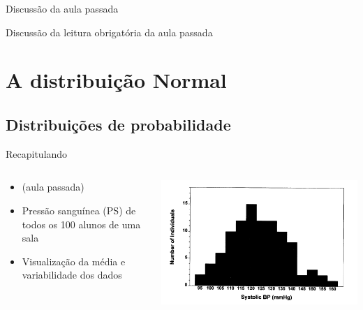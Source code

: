 \documentclass{beamer}
\begin{document}

\begin{frame}{\scriptsize Discussão da aula passada}
  \begin{block}{}
    Discussão da leitura obrigatória da aula passada
  \end{block}
\end{frame}

\section{A distribuição Normal}

\subsection{Distribuições de probabilidade}

\begin{frame}{\scriptsize Recapitulando}
  \begin{columns}
    \begin{column}{5cm}
      \begin{itemize}
      \item (aula passada)
      \item Pressão sanguínea (PS) de todos os 100 alunos de uma sala
      \item Visualização da média e variabilidade dos dados
      \end{itemize}
    \end{column}
    \begin{column}{5cm}
      \includegraphics[width=\textwidth]{Cap3/histograma1}
    \end{column}
  \end{columns}
\end{frame}
\end{document}
